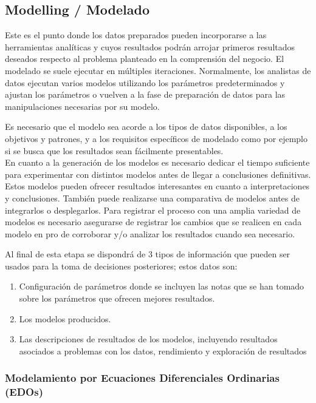 \subsection{Modelling / Modelado} 

Este es el punto donde los datos preparados pueden incorporarse a las herramientas analíticas y cuyos resultados podrán arrojar primeros resultados deseados respecto al problema planteado en la comprensión del negocio. El modelado se suele ejecutar en múltiples iteraciones. Normalmente, los analistas de datos ejecutan varios modelos utilizando los parámetros predeterminados y ajustan los parámetros o vuelven a la fase de preparación de datos para las manipulaciones necesarias por su modelo.

Es necesario que el modelo sea acorde a los tipos de datos disponibles, a los objetivos y patrones, y a los requisitos específicos de modelado como por ejemplo si se busca que los resultados sean fácilmente presentables.\\

En cuanto a la generación de los modelos es necesario dedicar el tiempo suficiente para experimentar con distintos modelos antes de llegar a conclusiones definitivas. Estos modelos pueden ofrecer resultados interesantes en cuanto a interpretaciones y conclusiones. También puede realizarse una comparativa de modelos antes de integrarlos o desplegarlos. Para registrar el proceso con una amplia variedad de modelos es necesario asegurarse de registrar los cambios que se realicen en cada modelo en pro de corroborar y/o analizar los resultados cuando sea necesario.

Al final de esta etapa se dispondrá de 3 tipos de información que pueden ser usados para la toma de decisiones posteriores; estos datos son: 
\begin{enumerate}
    \item Configuración de parámetros donde se incluyen las notas que se han tomado sobre los parámetros que ofrecen mejores resultados.
    \item Los modelos producidos.
    \item Las descripciones de resultados de los modelos, incluyendo resultados asociados a problemas con los datos, rendimiento y exploración de resultados
\end{enumerate}

\subsubsection{Modelamiento por Ecuaciones Diferenciales Ordinarias (EDOs)}
